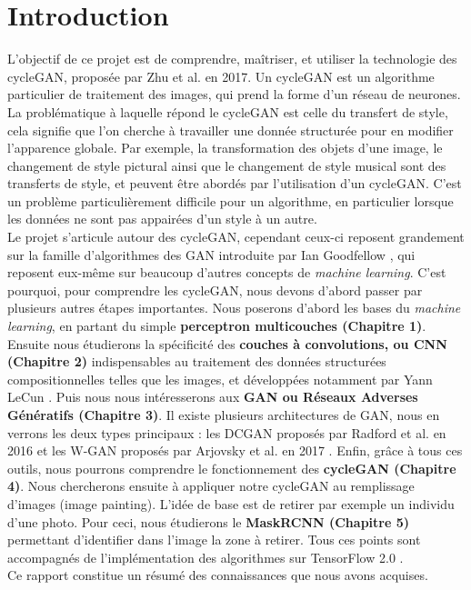 \chapter*{Introduction}


L'objectif de ce projet est de comprendre, maîtriser, et utiliser la technologie des cycleGAN, proposée par Zhu et al. \cite{zhu_unpaired_2018} en 2017. Un cycleGAN est un algorithme particulier de traitement des images, qui prend la forme d'un réseau de neurones. La problématique à laquelle répond le cycleGAN est celle du transfert de style, cela signifie que l'on cherche à travailler une donnée structurée pour en modifier l’apparence globale. Par exemple, la transformation des objets d'une image, le changement de style pictural ainsi que le changement de style musical sont des transferts de style, et peuvent être abordés par l'utilisation d'un cycleGAN. C'est un problème particulièrement difficile pour un algorithme, en particulier lorsque les données ne sont pas appairées d'un style à un autre.\\

Le projet s'articule autour des cycleGAN, cependant ceux-ci reposent grandement sur la famille d'algorithmes des GAN introduite par Ian Goodfellow \cite{goodfellow_generative_2014-1}, qui reposent eux-même sur beaucoup d'autres concepts de \textit{machine learning}. C'est pourquoi, pour comprendre les cycleGAN, nous devons d'abord passer par plusieurs autres étapes importantes. Nous poserons d'abord les bases du \textit{machine learning}, en partant du simple \textbf{perceptron multicouches (Chapitre 1)}. Ensuite nous étudierons la spécificité des \textbf{couches à convolutions, ou 
CNN (Chapitre 2)} indispensables au traitement des données structurées compositionnelles telles que les images, et développées notamment par Yann LeCun \cite{lecun_gradient-based_1998}. Puis nous nous intéresserons aux \textbf{GAN ou Réseaux Adverses Génératifs (Chapitre 3)}. Il existe plusieurs architectures de GAN, nous en verrons les deux types principaux : les DCGAN proposés par Radford et al. en 2016 \cite{radford_unsupervised_2016} et les W-GAN proposés par Arjovsky et al. en 2017 \cite{arjovsky_wasserstein_2017}. Enfin, grâce à tous ces outils, nous pourrons comprendre le fonctionnement des \textbf{cycleGAN (Chapitre 4)}. Nous chercherons ensuite à appliquer notre cycleGAN au remplissage d'images (image painting). L'idée de base est de retirer par exemple un individu d'une photo. Pour ceci, nous étudierons le \textbf{MaskRCNN (Chapitre 5)} permettant d'identifier dans l'image la zone à retirer. Tous ces points sont accompagnés de l'implémentation des algorithmes sur TensorFlow 2.0 \cite{goldsborough_tour_2016}.\\

Ce rapport constitue un résumé des connaissances que nous avons acquises.
